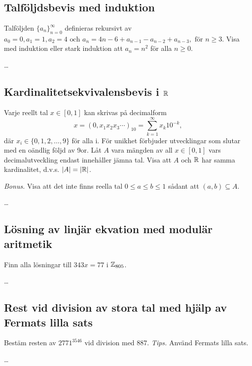 \documentclass{seminar}
\begin{document}
\section{}

\subsection{Talföljdsbevis med induktion}
\begin{questionquote}
	Talföljden $\{a_n\}_{n=0}^{\infty}$ definieras rekursivt av
	$a_0=0, a_1=1, a_2=4 \text{ och } a_n=4n-6+a_{n-1}-a_{n-2}+a_{n-3},\text{ för }n\ge3.$
	Visa med induktion eller stark induktion att $a_n=n^2$ för alla $n\ge0$.
\end{questionquote}

\dots

\clearpage
\subsection{Kardinalitetsekvivalensbevis i $\mathbb{R}$}
\begin{questionquote}
	Varje reellt tal $x\in[0, 1]$ kan skrivas på decimalform
	$$x=(0, x_1x_2x_3\cdots)_{10}=\sum_{k=1}^{\infty} x_k10^{-k},$$
	där $x_i\in\{0,1,2,\dots,9\}$ för alla i.
	För unikhet förbjuder utvecklingar som slutar med en oändlig följd av 9or.
	Låt $A$ vara mängden av all $x\in[0,1]$ vars decimalutveckling endast innehåller jämna tal.
	Visa att $A$ och $\mathbb{R}$ har samma kardinalitet, d.v.s. $|A|=|\mathbb{R}|$.

	\textit{Bonus.} Visa att det inte finns reella tal
	$0\le a\le b \le 1$ sådant att $(a, b)\subseteq A$.
\end{questionquote}

\dots

\clearpage
\subsection{Lösning av linjär ekvation med modulär aritmetik}
\begin{questionquote}
	Finn alla lösningar till $343x=77$ i $\mathbb{Z}_{805}$.
\end{questionquote}

\dots

\clearpage
\subsection{Rest vid division av stora tal med hjälp av Fermats lilla sats}
\begin{questionquote}
	Bestäm resten av $2771^{3546}$ vid division med $887$.
	\textit{Tips.} Använd Fermats lilla sats.
\end{questionquote}

\dots
\end{document}

